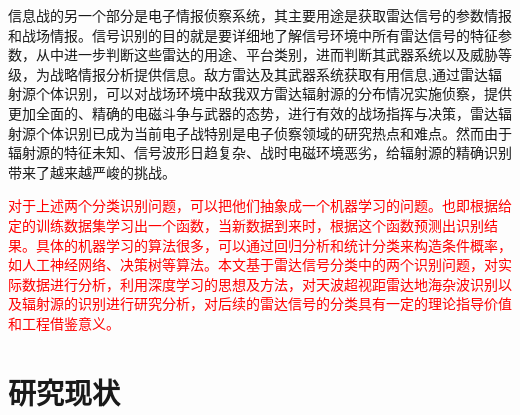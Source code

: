 信息战的另一个部分是电子情报侦察系统，其主要用途是获取雷达信号的参数情报和战场情报。信号识别的目的就是要详细地了解信号环境中所有雷达信号的特征参数，从中进一步判断这些雷达的用途、平台类别，进而判断其武器系统以及威胁等级，为战略情报分析提供信息。敌方雷达及其武器系统获取有用信息,通过雷达辐射源个体识别，可以对战场环境中敌我双方雷达辐射源的分布情况实施侦察，提供更加全面的、精确的电磁斗争与武器的态势，进行有效的战场指挥与决策，雷达辐射源个体识别已成为当前电子战特别是电子侦察领域的研究热点和难点\cite{matuszewski2008specific}。然而由于辐射源的特征未知、信号波形日趋复杂、战时电磁环境恶劣，给辐射源的精确识别带来了越来越严峻的挑战。

\textcolor{red}{对于上述两个分类识别问题，可以把他们抽象成一个机器学习的问题。也即根据给定的训练数据集学习出一个函数，当新数据到来时，根据这个函数预测出识别结果。具体的机器学习的算法很多，可以通过回归分析和统计分类来构造条件概率，如人工神经网络、决策树等算法。本文基于雷达信号分类中的两个识别问题，对实际数据进行分析，利用深度学习的思想及方法，对天波超视距雷达地海杂波识别以及辐射源的识别进行研究分析，对后续的雷达信号的分类具有一定的理论指导价值和工程借鉴意义。}

\section{研究现状}
